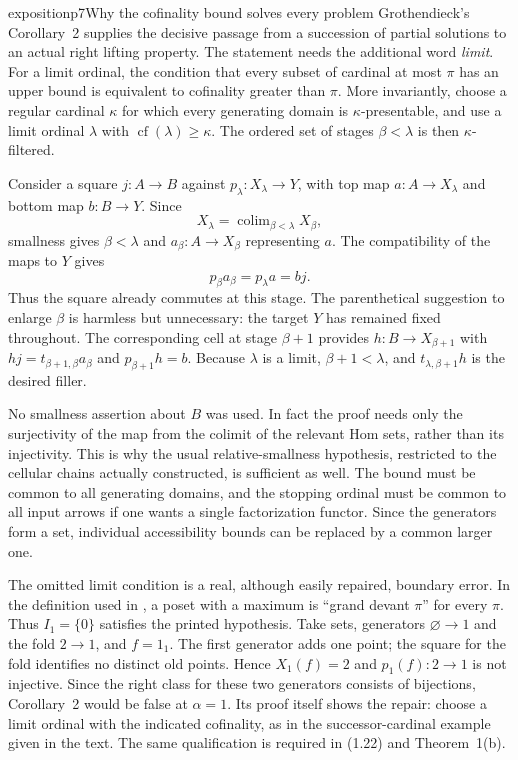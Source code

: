 \begin{dcomment}{exposition}{p7}{Why the cofinality bound solves every problem}
Grothendieck's Corollary~2 supplies the decisive passage from a succession of partial solutions to an actual right lifting property. The statement needs the additional word \emph{limit}. For a limit ordinal, the condition that every subset of cardinal at most $\pi$ has an upper bound is equivalent to cofinality greater than $\pi$. More invariantly, choose a regular cardinal $\kappa$ for which every generating domain is $\kappa$-presentable, and use a limit ordinal $\lambda$ with $\operatorname{cf}(\lambda)\geq\kappa$. The ordered set of stages $\beta<\lambda$ is then $\kappa$-filtered.

Consider a square $j:A\to B$ against $p_\lambda:X_\lambda\to Y$, with top map $a:A\to X_\lambda$ and bottom map $b:B\to Y$. Since
\[
 X_\lambda=\mathop{\mathrm{colim}}_{\beta<\lambda}X_\beta,
\]
smallness gives $\beta<\lambda$ and $a_\beta:A\to X_\beta$ representing $a$. The compatibility of the maps to $Y$ gives
\[
 p_\beta a_\beta=p_\lambda a=bj.
\]
Thus the square already commutes at this stage. The parenthetical suggestion to enlarge $\beta$ is harmless but unnecessary: the target $Y$ has remained fixed throughout. The corresponding cell at stage $\beta+1$ provides $h:B\to X_{\beta+1}$ with $hj=t_{\beta+1,\beta}a_\beta$ and $p_{\beta+1}h=b$. Because $\lambda$ is a limit, $\beta+1<\lambda$, and $t_{\lambda,\beta+1}h$ is the desired filler.

No smallness assertion about $B$ was used. In fact the proof needs only the surjectivity of the map from the colimit of the relevant Hom sets, rather than its injectivity. This is why the usual relative-smallness hypothesis, restricted to the cellular chains actually constructed, is sufficient as well. The bound must be common to all generating domains, and the stopping ordinal must be common to all input arrows if one wants a single factorization functor. Since the generators form a set, individual accessibility bounds can be replaced by a common larger one.

The omitted limit condition is a real, although easily repaired, boundary error. In the definition used in \citet[Expos\'e~I, Definition~9.1]{SGA4I1972}, a poset with a maximum is ``grand devant $\pi$'' for every $\pi$. Thus $I_1=\{0\}$ satisfies the printed hypothesis. Take sets, generators $\varnothing\to 1$ and the fold $2\to 1$, and $f=1_1$. The first generator adds one point; the square for the fold identifies no distinct old points. Hence $X_1(f)=2$ and $p_1(f):2\to1$ is not injective. Since the right class for these two generators consists of bijections, Corollary~2 would be false at $\alpha=1$. Its proof itself shows the repair: choose a limit ordinal with the indicated cofinality, as in the successor-cardinal example given in the text. The same qualification is required in (1.22) and Theorem~1(b).


\end{dcomment}
